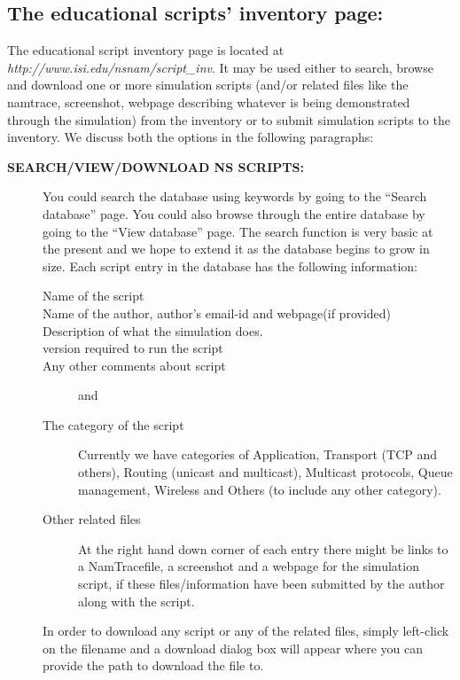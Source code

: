 \subsection{The educational scripts' inventory page:}
\label{sec:edu-script-inv-page}
The educational script inventory page is located at {\em http://www.isi.edu/nsnam/script\_inv}. It may be used either to search, browse and download one or more simulation scripts (and/or related files like the namtrace, screenshot, webpage describing whatever is being demonstrated through the simulation) from the inventory or to submit simulation scripts to the inventory. We discuss both the options in the following paragraphs:

\begin{description}
\item[{\bf SEARCH/VIEW/DOWNLOAD NS SCRIPTS:}]
You could search the database using keywords by going to the ``Search database'' page. You could also browse through the entire database by going to the ``View database'' page. The search function is very basic at the present and we hope to extend it as the database begins to grow in size.
Each script entry in the database has the following information:
\begin{description}
\item[{Name of the script}] 
\item[{Name of the author, author's email-id and webpage(if provided)}]
\item[{Description of what the simulation does.}]
\item[{\ns version required to run the script}]
\item[{Any other comments about script}] and 
\item[{The category of the script}] 
Currently we have categories of Application, Transport (TCP and others), Routing (unicast and multicast), Multicast protocols, Queue management, Wireless and Others (to include any other category).
\item[{Other related files}] 
At the right hand down corner of each entry there might be links to a NamTracefile, a screenshot and a webpage for the simulation script, if these files/information have been submitted by the author along with the script.
\end{description}

In order to download any script or any of the related files, simply left-click on the filename and a download dialog box will appear where you can provide the path to download the file to.





\end{description}
